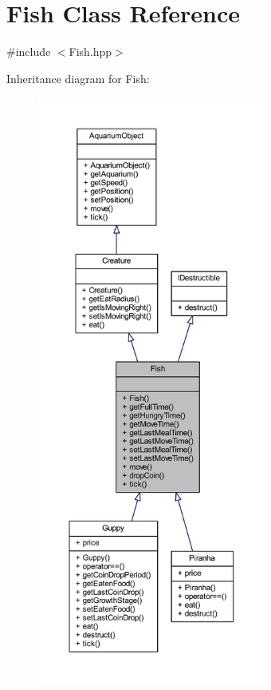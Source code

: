 \hypertarget{class_fish}{}\section{Fish Class Reference}
\label{class_fish}


{\ttfamily \#include $<$Fish.\+hpp$>$}



Inheritance diagram for Fish\+:\nopagebreak
\begin{figure}[H]
\begin{center}
\leavevmode
\includegraphics[height=550pt]{class_fish__inherit__graph}
\end{center}
\end{figure}


